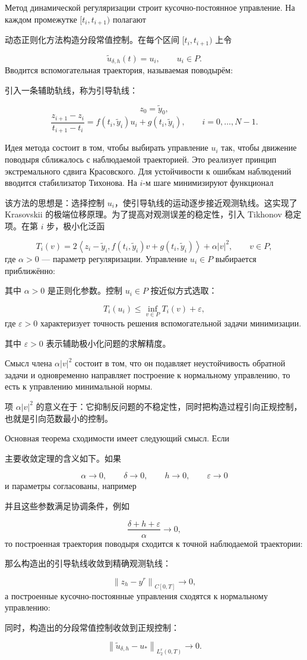 \documentclass[12pt,a4paper]{article}
\newcommand{\norm}[1]{\left\lVert #1\right\rVert}
\newcommand{\inner}[2]{\left\langle #1,#2\right\rangle}
\newcommand{\zh}[1]{\par\noindent #1\par}
\begin{document}
Метод динамической регуляризации строит кусочно-постоянное управление. На каждом промежутке $[t_i,t_{i+1})$ полагают
\zh{动态正则化方法构造分段常值控制。在每个区间 $[t_i,t_{i+1})$ 上令}
\begin{equation}
    \tilde u_{\delta,h}(t)=u_i,
    \qquad u_i\in P.
\end{equation}
Вводится вспомогательная траектория, называемая поводырём:
\zh{引入一条辅助轨线，称为引导轨线：}
\begin{equation}
    z_0=\tilde y_0,
\end{equation}
\begin{equation}
    \frac{z_{i+1}-z_i}{t_{i+1}-t_i}
    =f(t_i,\tilde y_i)u_i+g(t_i,\tilde y_i),
    \qquad i=0,\ldots,N-1.
\end{equation}

Идея метода состоит в том, чтобы выбирать управление $u_i$ так, чтобы движение поводыря сближалось с наблюдаемой траекторией. Это реализует принцип экстремального сдвига Красовского. Для устойчивости к ошибкам наблюдений вводится стабилизатор Тихонова. На $i$-м шаге минимизируют функционал
\zh{该方法的思想是：选择控制 $u_i$，使引导轨线的运动逐步接近观测轨线。这实现了 Krasovskii 的极端位移原理。为了提高对观测误差的稳定性，引入 Tikhonov 稳定项。在第 $i$ 步，极小化泛函}
\begin{equation}
    T_i(v)=
    2\inner{z_i-\tilde y_i}{f(t_i,\tilde y_i)v+g(t_i,\tilde y_i)}
    +\alpha |v|^2,
    \qquad v\in P,
\end{equation}
где $\alpha>0$ --- параметр регуляризации. Управление $u_i\in P$ выбирается приближённо:
\zh{其中 $\alpha>0$ 是正则化参数。控制 $u_i\in P$ 按近似方式选取：}
\begin{equation}
    T_i(u_i)\le \inf_{v\in P}T_i(v)+\varepsilon,
\end{equation}
где $\varepsilon>0$ характеризует точность решения вспомогательной задачи минимизации.
\zh{其中 $\varepsilon>0$ 表示辅助极小化问题的求解精度。}

Смысл члена $\alpha |v|^2$ состоит в том, что он подавляет неустойчивость обратной задачи и одновременно направляет построение к нормальному управлению, то есть к управлению минимальной нормы.
\zh{项 $\alpha |v|^2$ 的意义在于：它抑制反问题的不稳定性，同时把构造过程引向正规控制，也就是引向范数最小的控制。}

Основная теорема сходимости имеет следующий смысл. Если
\zh{主要收敛定理的含义如下。如果}
\[
    \alpha\to0,
    \qquad \delta\to0,
    \qquad h\to0,
    \qquad \varepsilon\to0
\]
и параметры согласованы, например
\zh{并且这些参数满足协调条件，例如}
\begin{equation}
    \frac{\delta+h+\varepsilon}{\alpha}\to0,
\end{equation}
то построенная траектория поводыря сходится к точной наблюдаемой траектории:
\zh{那么构造出的引导轨线收敛到精确观测轨线：}
\begin{equation}
    \norm{z_h-y^r}_{C[0,T]}\to0,
\end{equation}
а построенные кусочно-постоянные управления сходятся к нормальному управлению:
\zh{同时，构造出的分段常值控制收敛到正规控制：}
\begin{equation}
    \norm{\tilde u_{\delta,h}-u_*}_{L_2^r(0,T)}\to0.
\end{equation}
\end{document}
